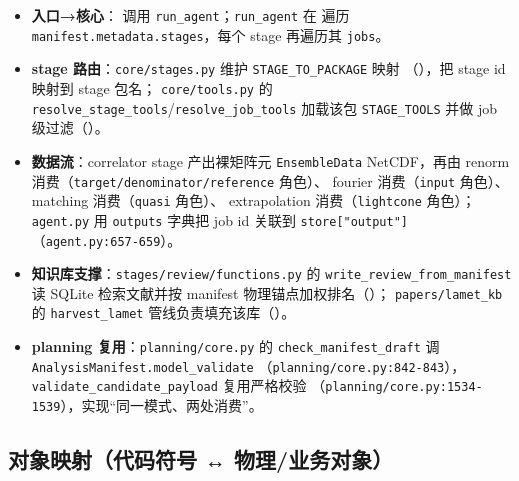 \documentclass[UTF8]{ctexart}
\begin{document}
\begin{itemize}
\item \textbf{入口→核心}：\texttt{} 调用 \texttt{run\_agent}；\texttt{run\_agent}
在 \texttt{} 遍历 \texttt{manifest.metadata.stages}，每个 stage 再遍历其 \texttt{jobs}。
\item \textbf{stage 路由}：\texttt{core/stages.py} 维护 \texttt{STAGE\_TO\_PACKAGE} 映射
（\texttt{}），把 stage id 映射到 stage 包名；
\texttt{core/tools.py} 的 \texttt{resolve\_stage\_tools}/\texttt{resolve\_job\_tools} 加载该包 \texttt{STAGE\_TOOLS}
并做 job 级过滤（\texttt{}）。
\item \textbf{数据流}：correlator stage 产出裸矩阵元 \texttt{EnsembleData} NetCDF，再由
renorm 消费（\texttt{\nolinkurl{target/denominator/reference}} 角色）、
fourier 消费（\texttt{input} 角色）、matching 消费（\texttt{quasi} 角色）、
extrapolation 消费（\texttt{lightcone} 角色）；\texttt{agent.py} 用 \texttt{outputs} 字典把 job id 关联到
\texttt{store["output"]}（\texttt{\nolinkurl{agent.py:657-659}}）。
\item \textbf{知识库支撑}：\texttt{stages/review/functions.py} 的 \texttt{write\_review\_from\_manifest}
读 SQLite 检索文献并按 manifest 物理锚点加权排名（\texttt{}）；
\texttt{papers/lamet\_kb} 的 \texttt{harvest\_lamet} 管线负责填充该库（\texttt{}）。
\item \textbf{planning 复用}：\texttt{planning/core.py} 的 \texttt{check\_manifest\_draft} 调 \texttt{\nolinkurl{AnalysisManifest.model_validate}}
（\texttt{\nolinkurl{planning/core.py:842-843}}），\texttt{validate\_candidate\_payload} 复用严格校验
（\texttt{\nolinkurl{planning/core.py:1534-1539}}），实现“同一模式、两处消费”。
\end{itemize}

\subsection{对象映射（代码符号 ↔ 物理/业务对象）}
\end{document}

